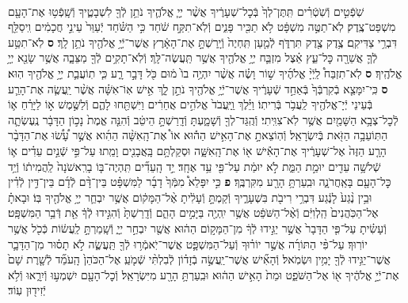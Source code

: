 \documentclass[twoside, openany, parskip=half, 11pt]{book}
\begin{document}
\begin{footnotesize}
\begin{multicols}{2}
\\
שֹֽׁפְֿטִ֣ים וְֿשֹֽׁטְֿרִ֗ים תִּֽתֶּן־לְךָ֙ בְּֿכׇל־שְׁעָרֶ֔יךָ אֲשֶׁ֨ר יְיָ֧ אֱלֹהֶ֛יךָ נֹתֵ֥ן לְֿךָ֖ לִשְׁבָטֶ֑יךָ וְֿשָֽׁפְֿט֥וּ אֶת־הָעָ֖ם מִשְׁפַּט־צֶֽדֶק׃ לֹֽא־תַטֶּ֣ה מִשְׁפָּ֔ט לֹ֥א תַכִּ֖יר פָּנִ֑ים וְֿלֹֽא־תִקַּ֣ח שֹׁ֔חַד כִּ֣י הַשֹּׁ֗חַד יְֿעַוֵּר֙ עֵינֵ֣י חֲכָמִ֔ים וִֽיסַלֵּ֖ף דִּבְרֵ֥י צַדִּיקִֽם׃ צֶ֥דֶק צֶ֖דֶק תִּרְדֹּ֑ף לְֿמַ֤עַן תִּֽחְיֶה֙ וְֿיָֽרַשְׁתָּ֣ אֶת־הָאָ֔רֶץ אֲשֶׁר־יְֿיָ֥ אֱלֹהֶ֖יךָ נֹתֵ֥ן לָֽךְ׃ \textbf{ס}
לֹֽא־תִטַּ֥ע לְֿךָ֛ אֲשֵׁרָ֖ה כׇּל־עֵ֑ץ אֵ֗צֶל מִזְבַּ֛ח יְיָ֥ אֱלֹהֶ֖יךָ אֲשֶׁ֥ר תַּֽעֲשֶׂה־לָּֽךְ׃ וְֿלֹֽא־תָקִ֥ים לְֿךָ֖ מַצֵּבָ֑ה אֲשֶׁ֥ר שָׂנֵ֖א יְיָ֥ אֱלֹהֶֽיךָ׃ \textbf{ס} לֹֽא־תִזְבַּח֩ לַֽיְֿיָ֨ אֱלֹהֶ֜יךָ שׁ֣וֹר וָשֶׂ֗ה אֲשֶׁ֨ר יִהְיֶ֥ה בוֹ֙ מ֔וּם כֹּ֖ל דָּבָ֣ר רָ֑ע כִּ֧י תֽוֹעֲבַ֛ת יְיָ֥ אֱלֹהֶ֖יךָ הֽוּא׃ \textbf{ס} כִּֽי־יִמָּצֵ֤א בְֿקִרְבְּֿךָ֙ בְּֿאַחַ֣ד שְֿׁעָרֶ֔יךָ אֲשֶׁר־יְֿיָ֥ אֱלֹהֶ֖יךָ נֹתֵ֣ן לָ֑ךְ אִ֣ישׁ אֽוֹ־אִשָּׁ֗ה אֲשֶׁ֨ר יַֽעֲשֶׂ֧ה אֶת־הָרַ֛ע בְּֿעֵינֵי יְֿיָ־אֱלֹהֶ֖יךָ לַֽעֲבֹ֥ר בְּֿרִיתֽוֹ׃ וַיֵּ֗לֶךְ וַֽיַּֽעֲבֹד֙ אֱלֹהִ֣ים אֲחֵרִ֔ים וַיִּשְׁתַּ֖חוּ לָהֶ֑ם וְֿלַשֶּׁ֣מֶשׁ א֣וֹ לַיָּרֵ֗חַ א֛וֹ לְֿכׇל־צְבָ֥א הַשָּׁמַ֖יִם אֲשֶׁ֥ר לֹֽא־צִוִּֽיתִי׃ וְֿהֻֽגַּד־לְךָ֖ וְֿשָׁמָ֑עְתָּ וְֿדָֽרַשְׁתָּ֣ הֵיטֵ֔ב וְֿהִנֵּ֤ה אֱמֶת֙ נָכ֣וֹן הַדָּבָ֔ר נֶֽעֶשְׂתָ֛ה הַתּֽוֹעֵבָ֥ה הַזֹּ֖את בְּֿיִשְׂרָאֵֽל׃ וְֿהֽוֹצֵאתָ֣ אֶת־הָאִ֣ישׁ הַה֡וּא אוֹ֩ אֶת־הָֽאִשָּׁ֨ה הַהִ֜וא אֲשֶׁ֣ר עָ֠שׂ֠וּ אֶת־הַדָּבָ֨ר הָרָ֤ע הַזֶּה֙ אֶל־שְׁעָרֶ֔יךָ אֶת־הָאִ֕ישׁ א֖וֹ אֶת־הָֽאִשָּׁ֑ה וּסְקַלְתָּ֥ם בָּֽאֲבָנִ֖ים וָמֵֽתוּ׃ עַל־פִּ֣י שְֿׁנַ֣יִם עֵדִ֗ים א֛וֹ שְֿׁלשָׁ֥ה עֵדִ֖ים יוּמַ֣ת הַמֵּ֑ת לֹ֣א יוּמַ֔ת עַל־פִּ֖י עֵ֥ד אֶחָֽד׃ יַ֣ד הָֽעֵדִ֞ים תִּֽהְיֶה־בּ֤וֹ בָרִֽאשֹׁנָה֙ לַֽהֲמִית֔וֹ וְֿיַ֥ד כׇּל־הָעָ֖ם בָּאַֽחֲרֹנָ֑ה וּבִֽעַרְתָּ֥ הָרָ֖ע מִקִּרְבֶּֽךָ׃ \textbf{פ}
כִּ֣י יִפָּלֵא֩ מִמְּֿךָ֙ דָבָ֜ר לַמִּשְׁפָּ֗ט בֵּין־דָּ֨ם לְֿדָ֜ם בֵּין־דִּ֣ין לְֿדִ֗ין וּבֵ֥ין נֶ֨גַע֙ לָנֶ֔גַע דִּבְרֵ֥י רִיבֹ֖ת בִּשְׁעָרֶ֑יךָ וְֿקַמְתָּ֣ וְֿעָלִ֔יתָ אֶ֨ל־הַמָּק֔וֹם אֲשֶׁ֥ר יִבְחַ֛ר יְיָ֥ אֱלֹהֶ֖יךָ בּֽוֹ׃ וּבָאתָ֗ אֶל־הַכֹּֽהֲנִים֙ הַֽלְוִיִּ֔ם וְֿאֶ֨ל־הַשֹּׁפֵ֔ט אֲשֶׁ֥ר יִֽהְיֶ֖ה בַּיָּמִ֣ים הָהֵ֑ם וְֿדָֽרַשְׁתָּ֙ וְֿהִגִּ֣ידוּ לְֿךָ֔ אֵ֖ת דְּֿבַ֥ר הַמִּשְׁפָּֽט׃ וְֿעָשִׂ֗יתָ עַל־פִּ֤י הַדָּבָר֙ אֲשֶׁ֣ר יַגִּ֣ידוּ לְֿךָ֔ מִן־הַמָּק֣וֹם הַה֔וּא אֲשֶׁ֖ר יִבְחַ֣ר יְיָ֑ וְֿשָֽׁמַרְתָּ֣ לַֽעֲשׂ֔וֹת כְּֿכֹ֖ל אֲשֶׁ֥ר יוֹרֽוּךָ׃
עַל־פִּ֨י הַתּוֹרָ֜ה אֲשֶׁ֣ר יוֹר֗וּךָ וְֿעַל־הַמִּשְׁפָּ֛ט אֲשֶׁר־יֹֽאמְֿר֥וּ לְֿךָ֖ תַּֽעֲשֶׂ֑ה לֹ֣א תָס֗וּר מִן־הַדָּבָ֛ר אֲשֶׁר־יַגִּ֥ידוּ לְֿךָ֖ יָמִ֥ין וּשְׂמֹֽאל׃ וְֿהָאִ֞ישׁ אֲשֶׁר־יַֽעֲשֶׂ֣ה בְֿזָד֗וֹן לְֿבִלְתִּ֨י שְֿׁמֹ֤עַֽ אֶל־הַכֹּהֵן֙ הָֽעֹמֵ֞ד לְֿשָׁ֤רֶת שָׁם֙ אֶת־יְֿיָ֣ אֱלֹהֶ֔יךָ א֖וֹ אֶל־הַשֹּׁפֵ֑ט וּמֵת֙ הָאִ֣ישׁ הַה֔וּא וּבִֽעַרְתָּ֥ הָרָ֖ע מִיִּשְׂרָאֵֽל׃ וְֿכׇל־הָעָ֖ם יִשְׁמְע֣וּ וְֿיִרָ֑אוּ וְֿלֹ֥א יְֿזִיד֖וּן עֽוֹד׃


\end{multicols}
\end{footnotesize}
\end{document}

